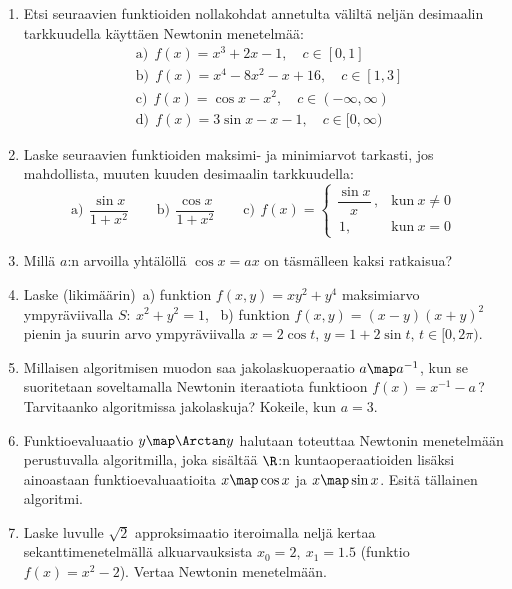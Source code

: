 \begin{enumerate}
\item
Etsi seuraavien funktioiden nollakohdat annetulta väliltä neljän desimaalin tarkkuudella
käyttäen Newtonin menetelmää:
\begin{align*}
&\text{a)}\ \ f(x)=x^3+2x-1, \quad c\in[0,1] \\
&\text{b)}\ \ f(x)=x^4-8x^2-x+16, \quad c\in[1,3] \\
&\text{c)}\ \ f(x)=\cos x-x^2, \quad c\in(-\infty,\infty) \\
&\text{d)}\ \ f(x)=3\sin x-x-1, \quad c\in[0,\infty)
\end{align*}

\item
Laske seuraavien funktioiden maksimi- ja minimiarvot tarkasti, jos mahdollista, muuten
kuuden desimaalin tarkkuudella:
\[
\text{a)}\,\ \frac{\sin x}{1+x^2} \qquad 
\text{b)}\,\ \frac{\cos x}{1+x^2} \qquad
\text{c)}\,\ f(x)=\begin{cases} 
             \dfrac{\sin x}{x}\,, &\text{kun}\ x \neq 0 \\ \,1, &\text{kun}\ x=0
             \end{cases}
\]

\item
Millä $a$:n arvoilla yhtälöllä $\cos x=ax$ on täsmälleen kaksi ratkaisua?

\item
Laske (likimäärin)\, a) funktion $f(x,y)=xy^2+y^4$ maksimiarvo ympyräviivalla
$S:\ x^2+y^2=1$, \, b) funktion $f(x,y)=(x-y)(x+y)^2$ pienin ja suurin arvo ympyräviivalla 
$x=2\cos t,\, y=1+2\sin t,\, t\in [0,2\pi)$.

\item 
Millaisen algoritmisen muodon saa jakolaskuoperaatio $a \map a^{-1}$, kun se suoritetaan 
soveltamalla Newtonin iteraatiota funktioon $f(x)=x^{-1}-a$\,? Tarvitaanko algoritmissa 
jakolaskuja? Kokeile, kun $a=3$.

\item
Funktioevaluaatio $y \map \Arctan y$ halutaan toteuttaa Newtonin menetelmään perustuvalla
algoritmilla, joka sisältää $\R$:n kuntaoperaatioiden lisäksi ainoastaan funktioevaluaatioita 
$x \map \cos x$ ja $x \map \sin x$. Esitä tällainen algoritmi.

\item
Laske luvulle $\sqrt{2}$ approksimaatio iteroimalla neljä kertaa sekanttimenetelmällä
alkuarvauksista $x_0=2,\ x_1=1.5$ (funktio $f(x)=x^2-2$). Vertaa Newtonin menetelmään.


\end{enumerate}
